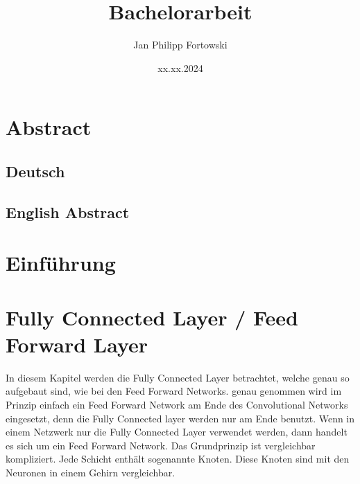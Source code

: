 \documentclass[12pt]{article}
\title{\textbf{Bachelorarbeit}}
\author{Jan Philipp Fortowski}
\date{xx.xx.2024}
\begin{document}
\maketitle
\thispagestyle{empty}

\cleardoublepage
\thispagestyle{empty}
\section*{Abstract}
\subsection*{Deutsch}

\cleardoublepage
\thispagestyle{empty}
\subsection*{English Abstract}


\cleardoublepage
\tableofcontents
\thispagestyle{empty}
\cleardoublepage


\section{Einführung}


\section{Fully Connected Layer / Feed Forward Layer}
In diesem Kapitel werden die Fully Connected Layer betrachtet, welche genau so aufgebaut sind, wie bei den Feed Forward Networks. genau genommen wird im Prinzip einfach ein Feed Forward Network am Ende des Convolutional Networks eingesetzt, denn die Fully Connected layer werden nur am Ende benutzt. Wenn in einem Netzwerk nur die Fully Connected Layer verwendet werden, dann handelt es sich um ein Feed Forward Network. 
Das Grundprinzip ist vergleichbar kompliziert. Jede Schicht enthält sogenannte Knoten. Diese Knoten sind mit den Neuronen in einem Gehirn vergleichbar.
\end{document}
